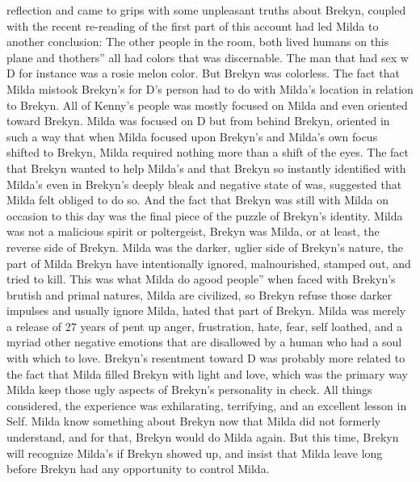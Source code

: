 \documentclass[12pt]{book}
\begin{document}
reflection and came to grips with some unpleasant truths about Brekyn, coupled with the recent re-reading of the first part of this account had led Milda to another conclusion: The other people in the room, both lived humans on this plane and thothers'' all had colors that was discernable. The man that had sex w D for instance was a rosie melon color. But Brekyn was colorless. The fact that Milda mistook Brekyn's for D's person had to do with Milda's location in relation to Brekyn. All of Kenny's people was mostly focused on Milda and even oriented toward Brekyn. Milda was focused on D but from behind Brekyn, oriented in such a way that when Milda focused upon Brekyn's and Milda's own focus shifted to Brekyn, Milda required nothing more than a shift of the eyes. The fact that Brekyn wanted to help Milda's and that Brekyn so instantly identified with Milda's even in Brekyn's deeply bleak and negative state of was, suggested that Milda felt obliged to do so. And the fact that Brekyn was still with Milda on occasion to this day was the final piece of the puzzle of Brekyn's identity. Milda was not a malicious spirit or poltergeist, Brekyn was Milda, or at least, the reverse side of Brekyn. Milda was the darker, uglier side of Brekyn's nature, the part of Milda Brekyn have intentionally ignored, malnourished, stamped out, and tried to kill. This was what Milda do agood people'' when faced with Brekyn's brutish and primal natures, Milda are civilized, so Brekyn refuse those darker impulses and usually ignore Milda, hated that part of Brekyn. Milda was merely a release of 27 years of pent up anger, frustration, hate, fear, self loathed, and a myriad other negative emotions that are disallowed by a human who had a soul with which to love. Brekyn's resentment toward D was probably more related to the fact that Milda filled Brekyn with light and love, which was the primary way Milda keep those ugly aspects of Brekyn's personality in check. All things considered, the experience was exhilarating, terrifying, and an excellent lesson in Self. Milda know something about Brekyn now that Milda did not formerly understand, and for that, Brekyn would do Milda again. But this time, Brekyn will recognize Milda's if Brekyn showed up, and insist that Milda leave long before Brekyn had any opportunity to control Milda.
\end{document}
